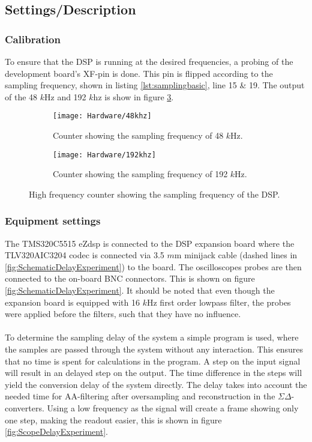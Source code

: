\subsection{Settings/Description}


\subsubsection{Calibration}
To ensure that the DSP is running at the desired frequencies, a probing of the development board's XF-pin is done. This pin is flipped according to the sampling frequency, shown in listing \ref{lst:samplingbasic}, line 15 \& 19. The output of the 48 $k$Hz and 192 $k$hz is show in figure \ref{fig:countingthefs}. 
\begin{figure}[H]
	\centering
	\begin{subfigure}[b]{.45\textwidth}
		\centering
		\texttt{[image: Hardware/48khz]}
		\caption{Counter showing the sampling frequency of 48 $k$Hz.}
		\label{fig:48khzcounter}
	\end{subfigure}
	\hfill
	\begin{subfigure}[b]{.45\textwidth}
		\centering
		\texttt{[image: Hardware/192khz]}
		\caption{Counter showing the sampling frequency of 192 $k$Hz.}
		\label{fig:192khzcounter}
	\end{subfigure}	
	\caption{High frequency counter showing the sampling frequency of the DSP.}
	\label{fig:countingthefs}
\end{figure}


\subsubsection{Equipment settings}
The TMS320C5515 eZdsp is connected to the DSP expansion board where the TLV320AIC3204 codec is connected via 3.5 $m$m minijack cable (dashed lines in \autoref{fig:SchematicDelayExperiment}) to the board. The oscilloscopes probes are then connected to the on-board BNC connectors. This is shown on figure \ref{fig:SchematicDelayExperiment}. It should be noted that even though the expansion board is equipped with 16 $k$Hz first order lowpass filter, the probes were applied before the filters, such that they have no influence. 
\\\\
To determine the sampling delay of the system a simple program is used, where the samples are passed through the system without any interaction. This ensures that no time is spent for calculations in the program. A step on the input signal will result in an delayed step on the output. The time difference in the steps will yield the conversion delay of the system directly. The delay takes into account the needed time for AA-filtering after oversampling and reconstruction in the $\Sigma\Delta$-converters. Using a low frequency as the signal will create a frame showing only one step, making the readout easier, this is shown in figure \ref{fig:ScopeDelayExperiment}.

